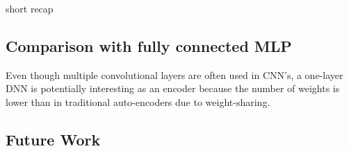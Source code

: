 short recap

\subsection{Comparison with fully connected MLP}
Even though multiple convolutional layers are often used in CNN's, a one-layer DNN is potentially interesting as an encoder because the number of weights is lower than in traditional auto-encoders due to weight-sharing. 
\subsection{Future Work}



\newpage